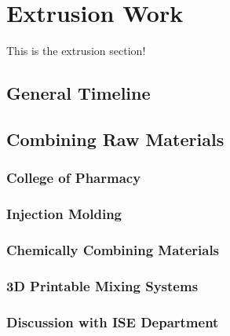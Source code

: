 \newpage
\section{Extrusion Work\label{methedology:extrusion}}
This is the extrusion section!

\subsection{General Timeline\label{sec:methedology:extrusion:timeline}}

\subsection{Combining Raw Materials\label{sec:methedology:extrusion:combiningMaterials}}

\subsubsection{College of Pharmacy\label{sec:methedology:extrusion:combiningMaterials:pharmacy}}

\subsubsection{Injection Molding\label{sec:methedology:extrusion:combiningMaterials:injectionMolding}}

\subsubsection{Chemically Combining Materials\label{sec:methedology:extrusion:combiningMaterials:chemicallyCombining}}

\subsubsection{3D Printable Mixing Systems\label{sec:methedology:extrusion:combiningMaterials:3dPrintedMixers}}

\subsubsection{Discussion with ISE Department\label{sec:methedology:extrusion:combiningMaterials:iseDiscussion}}

